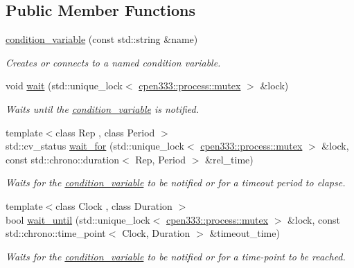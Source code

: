 \subsection*{Public Member Functions}
\begin{DoxyCompactItemize}
\item 
\hyperlink{classcpen333_1_1process_1_1condition__variable_a7f43a5fdf856a56f1e992117fc4e45c3}{condition\+\_\+variable} (const std\+::string \&name)
\begin{DoxyCompactList}\small\item\em Creates or connects to a named condition variable. \end{DoxyCompactList}\item 
void \hyperlink{classcpen333_1_1process_1_1condition__variable_ae5b7ef264d9618986be69d5c0c488925}{wait} (std\+::unique\+\_\+lock$<$ \hyperlink{classcpen333_1_1process_1_1mutex}{cpen333\+::process\+::mutex} $>$ \&lock)
\begin{DoxyCompactList}\small\item\em Waits until the \hyperlink{classcpen333_1_1process_1_1condition__variable}{condition\+\_\+variable} is notified. \end{DoxyCompactList}\item 
{\footnotesize template$<$class Rep , class Period $>$ }\\std\+::cv\+\_\+status \hyperlink{classcpen333_1_1process_1_1condition__variable_a6c6f153853d2c8d455781f0c35fdcb3b}{wait\+\_\+for} (std\+::unique\+\_\+lock$<$ \hyperlink{classcpen333_1_1process_1_1mutex}{cpen333\+::process\+::mutex} $>$ \&lock, const std\+::chrono\+::duration$<$ Rep, Period $>$ \&rel\+\_\+time)
\begin{DoxyCompactList}\small\item\em Waits for the \hyperlink{classcpen333_1_1process_1_1condition__variable}{condition\+\_\+variable} to be notified or for a timeout period to elapse. \end{DoxyCompactList}\item 
{\footnotesize template$<$class Clock , class Duration $>$ }\\bool \hyperlink{classcpen333_1_1process_1_1condition__variable_a20affb59c611bd2577e940ba5193d801}{wait\+\_\+until} (std\+::unique\+\_\+lock$<$ \hyperlink{classcpen333_1_1process_1_1mutex}{cpen333\+::process\+::mutex} $>$ \&lock, const std\+::chrono\+::time\+\_\+point$<$ Clock, Duration $>$ \&timeout\+\_\+time)
\begin{DoxyCompactList}\small\item\em Waits for the \hyperlink{classcpen333_1_1process_1_1condition__variable}{condition\+\_\+variable} to be notified or for a time-\/point to be reached. \end{DoxyCompactList}\item 

\end{DoxyCompactItemize}
